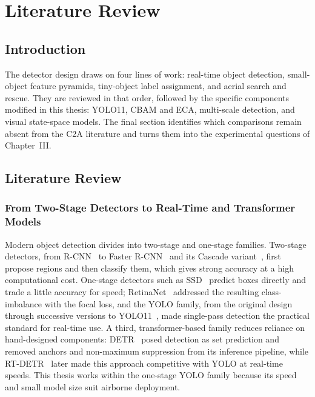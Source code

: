 \chapter{Literature Review}

\section{Introduction}
The detector design draws on four lines of work: real-time object detection,
small-object feature pyramids, tiny-object label assignment, and aerial search
and rescue. They are reviewed in that order, followed by the specific components
modified in this thesis: YOLO11, CBAM and ECA, multi-scale detection, and visual
state-space models. The final section identifies which comparisons remain absent
from the C2A literature and turns them into the experimental questions of
Chapter~III.

\section{Literature Review}

\subsection{From Two-Stage Detectors to Real-Time and Transformer Models}
Modern object detection divides into two-stage and one-stage families. Two-stage
detectors, from R-CNN~\cite{girshick2014rcnn} to Faster R-CNN~\cite{ren2015fasterrcnn}
and its Cascade variant~\cite{cai2018cascade}, first propose regions and then
classify them, which gives strong accuracy at a high computational cost. One-stage
detectors such as SSD~\cite{liu2016ssd} predict boxes directly and trade a little
accuracy for speed; RetinaNet~\cite{lin2017focal} addressed the resulting
class-imbalance with the focal loss, and the YOLO family, from the original
design~\cite{redmon2016yolo} through successive versions
\cite{redmon2018yolov3,bochkovskiy2020yolov4,wang2023yolov7,
jocher2023yolov8,wang2024yolov9,wang2024yolov10}
to YOLO11~\cite{jocher2024yolo11}, made single-pass detection the practical standard
for real-time use. A third, transformer-based family reduces reliance on
hand-designed components: DETR~\cite{carion2020detr} posed detection as set
prediction and removed anchors and non-maximum suppression from its inference
pipeline, while RT-DETR~\cite{zhao2024rtdetr} later made this approach
competitive with YOLO at real-time speeds. This thesis works within the one-stage
YOLO family because its speed and small model size suit airborne deployment.

